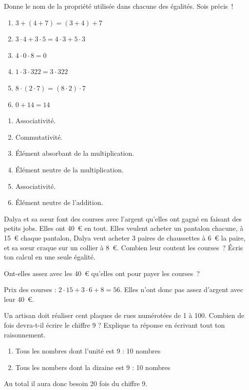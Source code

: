 \documentclass[../../syllabus_1.tex]{subfiles}
\begin{document}
\begin{exercise}
    Donne le nom de la propriété utilisée dans chacune des égalités. Sois précis~!
    \begin{enumerate}[cols=2]
        \item \(3+ (4+ 7)  = (3 + 4) + 7\)
        \item \(3 \cdot 4  +  3 \cdot 5  =  4 \cdot 3  +  5 \cdot 3\)
        \item \(4 \cdot 0 \cdot 8 = 0\)
        \item \(1 \cdot 3 \cdot 322  =  3 \cdot 322\)
        \item \(8 \cdot (2 \cdot 7) =  (8 \cdot 2) \cdot 7\)
        \item \(0  +  14  =  14\)
    \end{enumerate}
\end{exercise}
\begin{solution}
    \begin{enumerate}
        \item Associativité.
        \item Commutativité.
        \item Élément absorbant de la multiplication.
        \item Élément neutre de la multiplication.
        \item Associativité.
        \item Élément neutre de l'addition.
    \end{enumerate}
\end{solution}


\begin{exercise}
    Dalya et sa s\oe{}ur font des courses avec l'argent qu'elles ont gagné en faisant des petits jobs. Elles ont 40~€ en tout. Elles veulent acheter
    un pantalon chacune, à 15~€ chaque pantalon, Dalya veut acheter 3 paires de chaussettes à 6~€ la paire, et sa s\oe{}ur craque sur un collier
    à 8~€. Combien leur coutent les courses~? Écris ton calcul en une seule égalité.

    Ont-elles assez avec les 40~€ qu'elles ont pour payer les courses~?
\end{exercise}
\begin{solution}
    Prix des courses : $2 \cdot 15 + 3 \cdot 6 + 8 = 56$. Elles n'ont donc pas assez d'argent avec leur 40~€.
\end{solution}

\begin{exercise}
    Un artisan doit réaliser cent plaques de rues numérotées de 1 à 100.
    Combien de fois devra-t-il écrire le chiffre 9 ? Explique ta réponse
    en écrivant tout ton raisonnement.
\end{exercise}
\begin{solution}
    \begin{enumerate}
        \item Tous les nombres dont l'unité est 9 : 10 nombres
        \item Tous les nombers dont la dizaine est 9 : 10 nombres
    \end{enumerate}
    Au total il aura donc besoin 20 fois du chiffre 9.
\end{solution}
\end{document}
